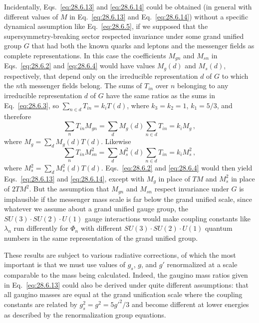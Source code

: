 Incidentally, Eqs.~\eqref{eq:28.6.13} and \eqref{eq:28.6.14} could be
obtained (in general with different values of \(M\) in
Eq.~\eqref{eq:28.6.13} and Eq.~\eqref{eq:28.6.14}) without a specific
dynamical assumption like Eq.~\eqref{eq:28.6.5}, if we supposed that the
supersymmetry-breaking sector respected invariance under some grand
unified group \(G\) that had both the known quarks and leptons and the
messenger fields as complete representations. In this case the
coefficients \(M_{gn}\) and \(M_{sn}\) in Eqs.~\eqref{eq:28.6.2} and
\eqref{eq:28.6.4} would have values \(M_g(d)\) and \(M_s(d)\),
respectively, that depend only on the irreducible representation \(d\) of
\(G\) to which the \(n\)th messenger fields belong. The sums of \(T_{in}\)
over \(n\) belonging to any irreducible representation \(d\) of \(G\)
have the same ratios as the sums in Eq.~\eqref{eq:28.6.3}, so
\(\sum_{n\in d}T_{in}=k_iT(d)\), where \(k_3=k_2=1\), \(k_1=5/3\), and
therefore
\[
  \sum_nT_{in}M_{gn}
  =\sum_dM_g(d)\sum_{n\in d}T_{in}
  =k_iM_g\,,
\]
where \(M_g=\sum_dM_g(d)T(d)\). Likewise
\[
  \sum_nT_{in}M_{sn}^2
  =\sum_dM_s^2(d)\sum_{n\in d}T_{in}
  =k_iM_s^2\,,
\]
where \(M_s^2=\sum_dM_s^2(d)T(d)\).
Eqs.~\eqref{eq:28.6.2} and \eqref{eq:28.6.4} would then yield
Eqs.~\eqref{eq:28.6.13} and \eqref{eq:28.6.14}, except with \(M_g\) in
place of \(TM\) and \(M_s^2\) in place of \(2TM^2\). But the assumption
that \(M_{gn}\) and \(M_{sn}\) respect invariance under \(G\) is implausible
if the messenger mass scale is far below the grand unified scale, since
whatever we assume about a grand unified gauge group, the
\(SU(3)\mathbin{\cdot}SU(2)\mathbin{\cdot}U(1)\) gauge interactions would
make coupling constants like \(\lambda_n\) run differently for \(\Phi_n\)
with different \(SU(3)\mathbin{\cdot}SU(2)\mathbin{\cdot}U(1)\) quantum
numbers in the same representation of the grand unified group.

These results are subject to various radiative corrections, of which the
most important is that we must use values of \(g_s\), \(g\), and \(g'\)
renormalized at a scale comparable to the mass being calculated. Indeed,
the gaugino mass ratios given in Eq.~\eqref{eq:28.6.13} could also be
derived under quite different assumptions: that all gaugino masses are
equal at the grand unification scale where the coupling constants are
related by \(g_s^2=g^2=5g'^2/3\) and become different at lower energies
as described by the renormalization group equations.

